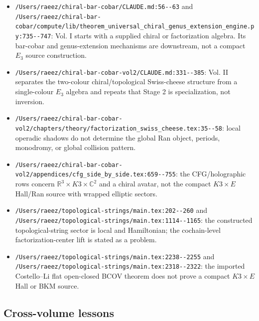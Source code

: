 \begin{itemize}
\item \verb|/Users/raeez/chiral-bar-cobar/CLAUDE.md:56--63| and
\verb|/Users/raeez/chiral-bar-cobar/compute/lib/theorem_universal_chiral_genus_extension_engine.py:735--747|:
Vol. I starts with a supplied chiral or factorization algebra.  Its
bar-cobar and genus-extension mechanisms are downstream, not a compact
\(E_3\) source construction.

\item \verb|/Users/raeez/chiral-bar-cobar-vol2/CLAUDE.md:331--385|:
Vol. II separates the two-colour chiral/topological Swiss-cheese
structure from a single-colour \(E_3\) algebra and repeats that
Stage 2 is specialization, not inversion.

\item \verb|/Users/raeez/chiral-bar-cobar-vol2/chapters/theory/factorization_swiss_cheese.tex:35--58|:
local operadic shadows do not determine the global Ran object, periods,
monodromy, or global collision pattern.

\item \verb|/Users/raeez/chiral-bar-cobar-vol2/appendices/cfg_side_by_side.tex:659--755|:
the CFG/holographic rows concern \(\mathbb R^3\times K3\times\mathbb C^2\)
and a chiral avatar, not the compact \(K3\times E\) Hall/Ran source with
wrapped elliptic sectors.

\item \verb|/Users/raeez/topological-strings/main.tex:202--260| and
\verb|/Users/raeez/topological-strings/main.tex:1114--1165|:
the constructed topological-string sector is local and Hamiltonian; the
cochain-level factorization-center lift is stated as a problem.

\item \verb|/Users/raeez/topological-strings/main.tex:2238--2255| and
\verb|/Users/raeez/topological-strings/main.tex:2318--2322|:
the imported Costello--Li flat open-closed BCOV theorem does not prove a
compact \(K3\times E\) Hall or BKM source.
\end{itemize}

\subsection{Cross-volume lessons}


